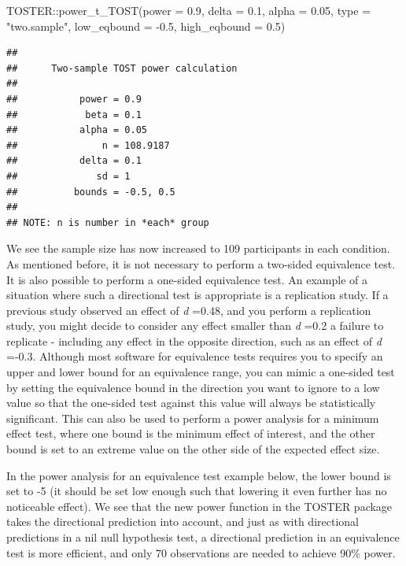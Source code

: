 \documentclass[
  oneside]{book}
\newenvironment{Shaded}{\begin{snugshade}}{\end{snugshade}}
\newcommand{\AttributeTok}[1]{\textcolor[rgb]{0.77,0.63,0.00}{#1}}
\newcommand{\FloatTok}[1]{\textcolor[rgb]{0.00,0.00,0.81}{#1}}
\newcommand{\FunctionTok}[1]{\textcolor[rgb]{0.00,0.00,0.00}{#1}}
\newcommand{\NormalTok}[1]{#1}
\newcommand{\SpecialCharTok}[1]{\textcolor[rgb]{0.00,0.00,0.00}{#1}}
\newcommand{\StringTok}[1]{\textcolor[rgb]{0.31,0.60,0.02}{#1}}
\begin{document}
\begin{Shaded}
\begin{Highlighting}[]
\NormalTok{TOSTER}\SpecialCharTok{::}\FunctionTok{power\_t\_TOST}\NormalTok{(}\AttributeTok{power =} \FloatTok{0.9}\NormalTok{, }\AttributeTok{delta =} \FloatTok{0.1}\NormalTok{,}
                     \AttributeTok{alpha =} \FloatTok{0.05}\NormalTok{, }\AttributeTok{type =} \StringTok{"two.sample"}\NormalTok{,}
                     \AttributeTok{low\_eqbound =} \SpecialCharTok{{-}}\FloatTok{0.5}\NormalTok{, }\AttributeTok{high\_eqbound =} \FloatTok{0.5}\NormalTok{)}
\end{Highlighting}
\end{Shaded}

\begin{verbatim}
## 
##      Two-sample TOST power calculation 
## 
##           power = 0.9
##            beta = 0.1
##           alpha = 0.05
##               n = 108.9187
##           delta = 0.1
##              sd = 1
##          bounds = -0.5, 0.5
## 
## NOTE: n is number in *each* group
\end{verbatim}

We see the sample size has now increased to 109 participants in each condition. As mentioned before, it is not necessary to perform a two-sided equivalence test. It is also possible to perform a one-sided equivalence test. An example of a situation where such a directional test is appropriate is a replication study. If a previous study observed an effect of \emph{d} =0.48, and you perform a replication study, you might decide to consider any effect smaller than \emph{d} =0.2 a failure to replicate - including any effect in the opposite direction, such as an effect of \emph{d} =-0.3. Although most software for equivalence tests requires you to specify an upper and lower bound for an equivalence range, you can mimic a one-sided test by setting the equivalence bound in the direction you want to ignore to a low value so that the one-sided test against this value will always be statistically significant. This can also be used to perform a power analysis for a minimum effect test, where one bound is the minimum effect of interest, and the other bound is set to an extreme value on the other side of the expected effect size.

In the power analysis for an equivalence test example below, the lower bound is set to -5 (it should be set low enough such that lowering it even further has no noticeable effect). We see that the new power function in the TOSTER package takes the directional prediction into account, and just as with directional predictions in a nil null hypothesis test, a directional prediction in an equivalence test is more efficient, and only 70 observations are needed to achieve 90\% power.
\end{document}

